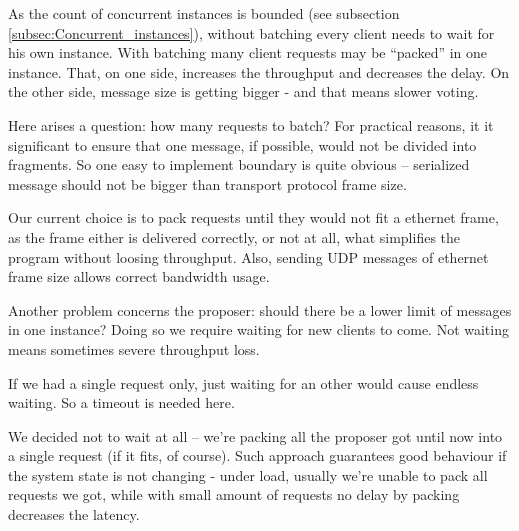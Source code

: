 As the count of concurrent instances is bounded (see subsection \ref{subsec:Concurrent_instances}), without batching every client needs to wait for his own instance. With batching many client requests may be ``packed'' in one instance. That, on one side, increases the throughput and decreases the delay.
On the other side, message size is getting bigger - and that means slower voting.

Here arises a question: how many requests to batch? For practical reasons, it it significant to ensure that one message, if possible, would not be divided into fragments. So one easy to implement boundary is quite obvious -- serialized message should not be bigger than transport protocol frame size.

Our current choice is to pack requests until they would not fit a ethernet frame, as the frame either is delivered correctly, or not at all, what simplifies the program without loosing throughput. Also, sending UDP messages of ethernet frame size allows correct bandwidth usage.

Another problem concerns the proposer: should there be a lower limit of messages in one instance? Doing so we require waiting for new clients to come. Not waiting means sometimes severe throughput loss.

If we had a single request only, just waiting for an other would cause endless waiting. So a timeout is needed here.

We decided not to wait at all -- we're packing all the proposer got until now into a single request (if it fits, of course). Such approach guarantees good behaviour if the system state is not changing - under load, usually we're unable to pack all requests we got, while with small amount of requests no delay by packing decreases the latency.

























